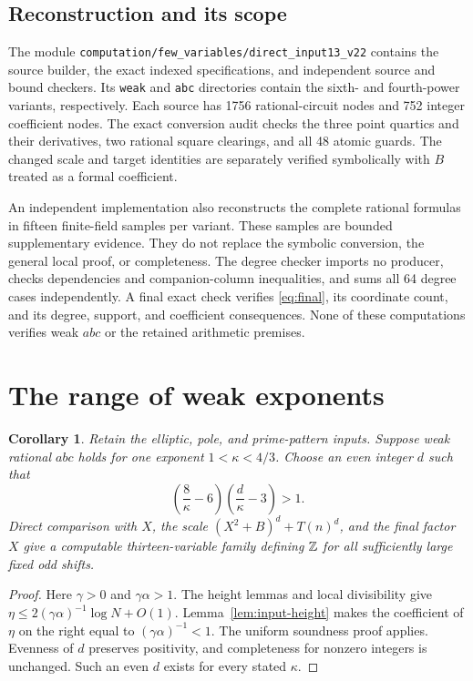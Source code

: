 \documentclass[11pt,a4paper]{article}
\newtheorem{corollary}[theorem]{Corollary}
\begin{document}
\subsection{Reconstruction and its scope}

The module \nolinkurl{computation/few_variables/direct_input13_v22}
contains the source builder, the exact indexed specifications,
and independent source and bound checkers. Its \texttt{weak}
and \texttt{abc} directories contain the sixth- and fourth-power
variants, respectively. Each source has 1756 rational-circuit nodes
and 752 integer coefficient nodes. The exact conversion audit
checks the three point quartics and their derivatives, two rational
square clearings, and all 48 atomic guards. The changed scale and
target identities are separately verified symbolically with $B$
treated as a formal coefficient.

An independent implementation also reconstructs the complete
rational formulas in fifteen finite-field samples per variant.
These samples are bounded supplementary evidence. They do not
replace the symbolic conversion, the general local proof, or
completeness. The degree checker imports no producer, checks
dependencies and companion-column inequalities, and sums all
64 degree cases independently. A final exact check verifies
\eqref{eq:final}, its coordinate count, and its degree, support,
and coefficient consequences. None of these computations verifies
weak $abc$ or the retained arithmetic premises.

\section{The range of weak exponents}

\begin{corollary}
Retain the elliptic, pole, and prime-pattern inputs. Suppose weak
rational $abc$ holds for one exponent $1<\kappa<4/3$. Choose an
even integer $d$ such that
\[
 \left(\frac8\kappa-6\right)
 \left(\frac d\kappa-3\right)>1.
\]
Direct comparison with $X$, the scale
$(X^2+B)^d+T(n)^d$, and the final factor $X$ give a computable
thirteen-variable family defining $\mathbb Z$ for all sufficiently large
fixed odd shifts.
\end{corollary}
\begin{proof}
Here $\gamma>0$ and $\gamma\alpha>1$. The height lemmas and
local divisibility give $\eta\le2(\gamma\alpha)^{-1}\log N+O(1)$.
Lemma~\ref{lem:input-height} makes the coefficient of $\eta$ on
the right equal to $(\gamma\alpha)^{-1}<1$. The uniform
soundness proof applies. Evenness of $d$ preserves positivity,
and completeness for nonzero integers is unchanged. Such an
even $d$ exists for every stated $\kappa$.
\end{proof}
\end{document}
